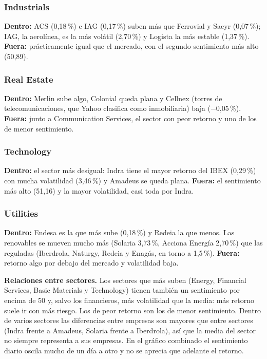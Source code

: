 \documentclass[11pt,a4paper]{article}
\begin{document}
\subsubsection*{Industrials}
\textbf{Dentro:} ACS (0,18\,\%) e IAG (0,17\,\%) suben más que Ferrovial y Sacyr (0,07\,\%); IAG, la aerolínea, es la más volátil (2,70\,\%) y Logista la más estable (1,37\,\%). \textbf{Fuera:} prácticamente igual que el mercado, con el segundo sentimiento más alto (50,89).

\subsubsection*{Real Estate}
\textbf{Dentro:} Merlin sube algo, Colonial queda plana y Cellnex (torres de telecomunicaciones, que Yahoo clasifica como inmobiliaria) baja ($-$0,05\,\%). \textbf{Fuera:} junto a Communication Services, el sector con peor retorno y uno de los de menor sentimiento.

\subsubsection*{Technology}
\textbf{Dentro:} el sector más desigual: Indra tiene el mayor retorno del IBEX (0,29\,\%) con mucha volatilidad (3,46\,\%) y Amadeus se queda plana. \textbf{Fuera:} el sentimiento más alto (51,16) y la mayor volatilidad, casi toda por Indra.

\subsubsection*{Utilities}
\textbf{Dentro:} Endesa es la que más sube (0,18\,\%) y Redeia la que menos. Las renovables se mueven mucho más (Solaria 3,73\,\%, Acciona Energía 2,70\,\%) que las reguladas (Iberdrola, Naturgy, Redeia y Enagás, en torno a 1,5\,\%). \textbf{Fuera:} retorno algo por debajo del mercado y volatilidad baja.

\textbf{Relaciones entre sectores.} Los sectores que más suben (Energy, Financial Services, Basic Materials y Technology) tienen también un sentimiento por encima de 50 y, salvo los financieros, más volatilidad que la media: más retorno suele ir con más riesgo. Los de peor retorno son los de menor sentimiento. Dentro de varios sectores las diferencias entre empresas son mayores que entre sectores (Indra frente a Amadeus, Solaria frente a Iberdrola), así que la media del sector no siempre representa a sus empresas. En el gráfico combinado el sentimiento diario oscila mucho de un día a otro y no se aprecia que adelante el retorno.
\end{document}
